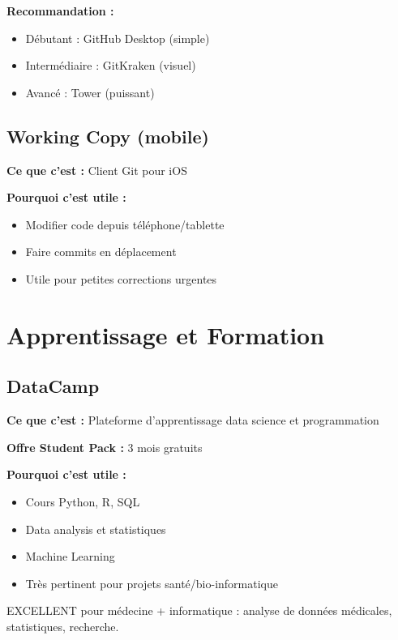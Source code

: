 \documentclass[11pt,a4paper]{article}
\begin{document}
\begin{conseil}
\textbf{Recommandation :}
\begin{itemize}
    \item Débutant : GitHub Desktop (simple)
    \item Intermédiaire : GitKraken (visuel)
    \item Avancé : Tower (puissant)
\end{itemize}
\end{conseil}

\subsection{Working Copy (mobile)}

\textbf{Ce que c'est :} Client Git pour iOS

\textbf{Pourquoi c'est utile :}
\begin{itemize}
    \item Modifier code depuis téléphone/tablette
    \item Faire commits en déplacement
    \item Utile pour petites corrections urgentes
\end{itemize}

\newpage
\section{Apprentissage et Formation}

\subsection{DataCamp}

\textbf{Ce que c'est :} Plateforme d'apprentissage data science et programmation

\textbf{Offre Student Pack :} 3 mois gratuits

\textbf{Pourquoi c'est utile :}
\begin{itemize}
    \item Cours Python, R, SQL
    \item Data analysis et statistiques
    \item Machine Learning
    \item Très pertinent pour projets santé/bio-informatique
\end{itemize}

\begin{conseil}
EXCELLENT pour médecine + informatique : analyse de données médicales, statistiques, recherche.
\end{conseil}
\end{document}
